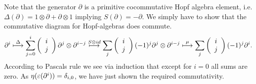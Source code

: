 \bws Note that the generator $\partial$ is a primitive cocommutative Hopf algebra element, i.e. $\Delta(\partial) = 1 \otimes \partial + \partial \otimes 1$ implying $S(\partial) = - \partial$. We simply have to show that the commutative diagram for Hopf-algebras does commute.
$$\partial^i \stackrel{\Delta}{\longmapsto} \sum_{j=0}^i\left(\bao{c}
i\\
j\\
\ea\right) \partial^j \otimes \partial^{i-j} \stackrel{S \otimes id}{\longmapsto} \sum_{j} \left(\bao{c}
i\\
j\\
\ea\right) (-1)^j \partial^j \otimes \partial^{i-j} \stackrel{\mu}{\longmapsto} \sum_j \left(\bao{c}
i\\
j\\
\ea\right) (-1)^j \partial^i.$$
According to Pascals rule we see via induction that except for $i = 0$ all sums are zero. As $\eta(\eps(\partial^i)) = \delta_{i,0}$, we have just shown the required commutativity.
